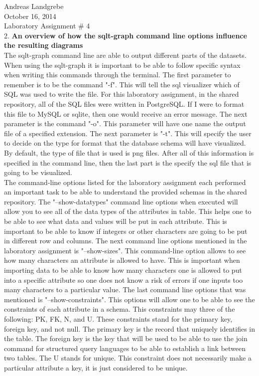 \documentclass{article}
\begin{document}
\noindent
Andreas Landgrebe
\\
October 16, 2014
\\
Laboratory Assignment \# 4
\\
2. \textbf{An overview of how the sqlt-graph command line options influence the resulting diagrams}
\\
The sqlt-graph command line are able to output different parts of the datasets. When using the sqlt-graph it is important to be able to follow specific syntax when writing this commands through the terminal. The first parameter to remember is to be the command "-f". This will tell the sql visualizer which of SQL was used to write the file. For this laboratory assignment, in the shared repository, all of the SQL files were written in PostgreSQL. If I were to format this file to MySQL or sqlite, then one would receive an error message. The next parameter is the command "-o". This parameter  will have one name the output file of a specified extension. The next parameter is "-t". This will specify the user to decide on the type for format that the database schema will have visualized. By default, the type of file that is used is png files. After all of this information is specified in the command line, then the last part is the specify the sql file that is going to be visualized.
\\
The command-line options listed for the laboratory assignment each performed an important task to be able to understand the provided schemas in the shared repository. The "--show-datatypes" command line options when executed will allow you to see all of the data types of the attributes in table. This helps one to be able to see what data and values will be put in each attribute. This is important to be able to know if integers or other characters are going to be put in different row and columns. The next command line options mentioned in the laboratory assignment is "--show-sizes". This command-line option allows to see how many characters an attribute is allowed to have. This is important when importing data to be able to know how many characters one is allowed to put into a specific attribute so one does not know a risk of errors if one inputs too many characters to a particular value. The last command line options that was mentioned is "--show-constraints". This options will allow one to be able to see the constraints of each attribute in a schema. This constraints may three of the following: PK, FK, N, and U. These constraints stand for the primary key, foreign key, and not null. The primary key is the record that uniquely identifies in the table. The foreign key is the key that will be used to be able to use the join command for structured query languages to be able to establish a link between two tables. The U stands for unique. This constraint does not necessarily make a particular attribute a key, it is just considered to be unique. 
\end{document}
